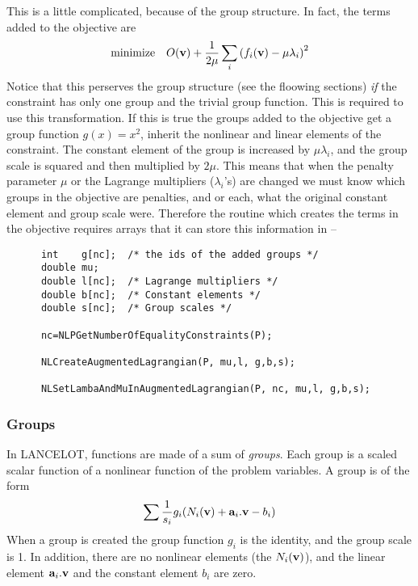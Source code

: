 \documentclass[12pt]{article}
\begin{document}
    This is a little complicated, because of the group structure. In fact, the terms added to the objective are
    \begin{displaymath}
      {\rm minimize}\quad O({\bf v}) + {1\over{2\mu}}\sum_i \left( f_i({\bf v})-\mu\lambda_i\right)^2
    \end{displaymath}
    Notice that this perserves the group structure (see the floowing sections) {\it if} the constraint has
    only one group and the trivial group function. This is required to use this transformation. If this is
    true the groups added to the objective get a group function $g(x)=x^2$,
    inherit the nonlinear and linear elements of the constraint. The constant element of the group
    is increased by $\mu\lambda_i$, and the group scale is squared and then multiplied by $2\mu$. This
    means that when the penalty parameter $\mu$ or the Lagrange multipliers ($\lambda_i$'s) are changed 
    we must know which groups in the objective are penalties, and or each, what the original constant
    element and group scale were. Therefore the routine which creates the terms in the objective 
    requires arrays that it can store this information in --
    \begin{verbatim}
      int    g[nc];  /* the ids of the added groups */
      double mu;
      double l[nc];  /* Lagrange multipliers */
      double b[nc];  /* Constant elements */
      double s[nc];  /* Group scales */

      nc=NLPGetNumberOfEqualityConstraints(P);

      NLCreateAugmentedLagrangian(P, mu,l, g,b,s);

      NLSetLambaAndMuInAugmentedLagrangian(P, nc, mu,l, g,b,s);
    \end{verbatim}

   \subsubsection{Groups}
     In LANCELOT, functions are made of a sum of {\it groups}. Each group is a scaled scalar function of a nonlinear
     function of the problem variables. A group is of the form
     \begin{displaymath}
      \sum {1\over{s_i}}g_i(N_i({\bf v})+ {\bf a}_i.{\bf v}-b_i)
     \end{displaymath}
     When a group is created the group function $g_i$ is the identity, and the group scale is 1. In addition, there are no
     nonlinear elements (the $N_i({\bf v})$), and the linear element ${\bf a}_i.{\bf v}$ and the constant element
     $b_i$ are zero. 
\end{document}
